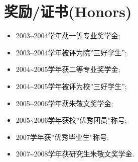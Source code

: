 \documentclass[a4paper,10pt,english]{manual}
\begin{document}
\section{奖励/证书(Honors)}
\begin{itemize}
\item {} 
2003\textasciitilde{}2004学年获一等专业奖学金;

\item {} 
2003\textasciitilde{}2004学年被评为院''三好学生'';

\item {} 
2004\textasciitilde{}2005学年获二等专业奖学金;

\item {} 
2004\textasciitilde{}2005学年被评为校''三好学生'';

\item {} 
2005\textasciitilde{}2006学年获朱敬文奖学金;

\item {} 
2005\textasciitilde{}2006学年获校''优秀团员''称号;

\item {} 
2007学年获''优秀毕业生''称号;

\item {} 
2007\textasciitilde{}2008学年获研究生朱敬文奖学金.

\end{itemize}
\end{document}
